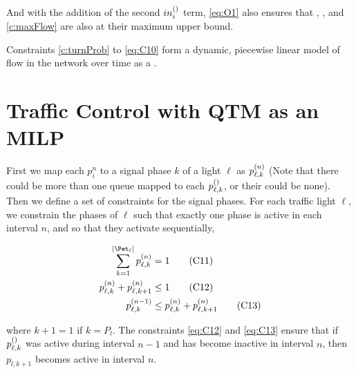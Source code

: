 And with the addition of the second $\inq[]{i}$ term, \ref{eq:O1} also ensures
that , , and \ref{c:maxFlow} are also at their maximum upper
bound.



Constraints \ref{c:turnProb} to \ref{eq:C10} form a dynamic, piecewise linear model
of flow in the network over time as a .




\section{Traffic Control with QTM as an MILP}






First we map each $p_i^n$ to a signal phase $k$ of a light $\ell$ as
$\p{\ell}{k}$ (Note that there could be more than one queue mapped to each
$\p[]{\ell}{k}$, or their could be none). Then we define a set of constraints
for the signal phases. For each traffic light $\ell$, we constrain the phases of
$\ell$ such that exactly one phase is active in each interval $n$, and so that
they activate sequentially,

\begin{align}
\sum\limits_{k=1}^{\Pn} \p{\ell}{k} &= 1\tag{C11}\label{eq:C11}\\
\p{\ell}{k} + \p{\ell}{k+1} &\le 1\tag{C12}\label{eq:C12}\\
\p[n-1]{\ell}{k} &\le \p{\ell}{k} + \p{\ell}{k+1}\tag{C13}\label{eq:C13}
\end{align}

where $k+1=1$ if $k=P_l$. The constraints \ref{eq:C12} and \ref{eq:C13} ensure
that if $\p[]{\ell}{k}$ was active during interval $n-1$ and has become inactive
in interval $n$, then $p_{l,k+1}$ becomes active in interval $n$.

